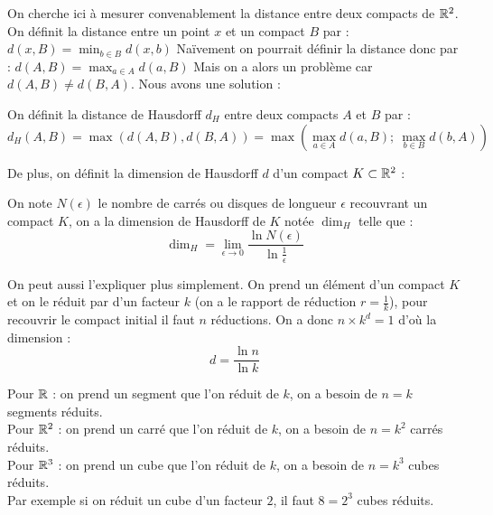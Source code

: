 		On cherche ici à mesurer convenablement la distance entre deux compacts de $\mathbb{R}^2$.
		On définit la distance entre un point $x$ et un compact $B$ par : $ d(x,B) = \min_{b\in B}{d(x,b)} $
		Naïvement on pourrait définir la distance donc par : $d(A,B) = \max_{a\in A}{d(a,B)}$
		Mais on a alors un problème car $d(A,B)\neq d(B,A)$.
		Nous avons une solution :

		\begin{definition}%
			\label{def-2-distanceHausdorff}
			On définit la distance de Hausdorff $d_H$ entre deux compacts $A$ et $ B$ par :
			\begin{equation}
				\label{eq-2-distanceHausdorff}
				d_H(A,B) = \max \left( d(A,B), d(B,A) \right) = \max \left( \max_{a\in A}d(a,B) ;~ \max_{b\in B}d(b,A)  \right)
			\end{equation}
		\end{definition}
			
		\medskip

		De plus, on définit la dimension de Hausdorff $d$ d'un compact $K \subset \mathbb{R}^2$ :

		\begin{definition}
			\label{def-2-hausdorff}
			On note $N(\epsilon)$ le nombre de carrés ou disques de longueur $\epsilon$ recouvrant un compact $K$, on a la dimension de Hausdorff de $K$ notée $\dim_H$ telle que :
			\begin{equation}
				\label{eq-2-dimHaussdorffEps}
				\dim_H = \lim_{\epsilon\to 0} \frac{\ln{N(\epsilon)}}{\ln{\frac{1}{\epsilon}}}		
			\end{equation}
		\end{definition}

		On peut aussi l'expliquer plus simplement.
		On prend un élément d'un compact $K$ et on le réduit par d'un facteur $k$ (on a le rapport de réduction $r = \frac{1}{k}$), pour recouvrir le compact initial il faut $n$ réductions. On a donc $n\times k^d = 1$ d'où la dimension :
		\begin{equation}
			\label{eq-2-dimHaussdorff}
			d = \frac{\ln n}{\ln k}
		\end{equation}

		\begin{ex}
			Pour $\mathbb{R}$ : on prend un segment que l'on réduit de $k$, on a besoin de $n=k$ segments réduits.	\\
			Pour $\mathbb{R}^2$ : on prend un carré que l'on réduit de $k$, on a besoin de $n=k^2$ carrés réduits.	\\
			Pour $\mathbb{R}^3$ : on prend un cube que l'on réduit de $k$, on a besoin de $n=k^3$ cubes réduits.	\\
			Par exemple si on réduit un cube d'un facteur $2$, il faut $8 = 2^3$ cubes réduits.
		\end{ex}

